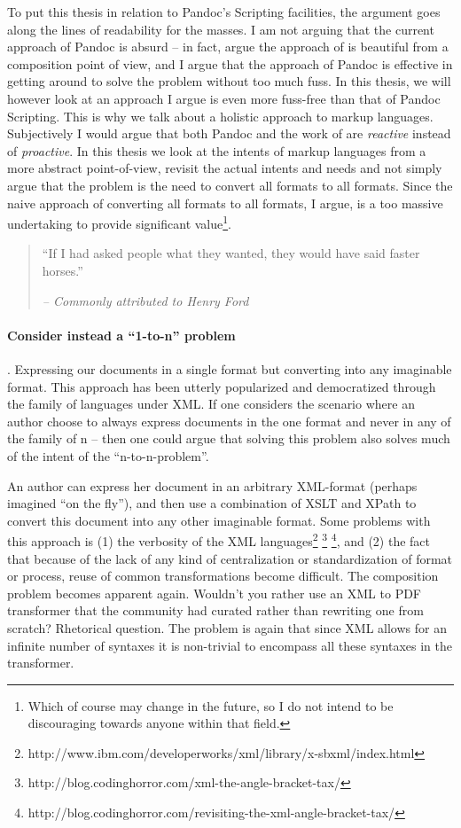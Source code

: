 \documentclass{scrreprt}
\begin{document}
To put this thesis in relation to Pandoc's Scripting facilities, the argument goes along the lines of readability for the masses. I am not arguing that the current approach of Pandoc is absurd -- in fact, argue the approach of \citet{krijnen} is beautiful from a composition point of view, and I argue that the approach of Pandoc is effective in getting around to solve the problem without too much fuss. In this thesis, we will however look at an approach I argue is even more fuss-free than that of Pandoc Scripting. This is why we talk about a holistic approach to markup languages. Subjectively I would argue that both Pandoc and the work of \citet{krijnen} are \emph{reactive} instead of \emph{proactive}. In this thesis we look at the intents of markup languages from a more abstract point-of-view, revisit the actual intents and needs and not simply argue that the problem is the need to convert all formats to all formats. Since the naive approach of converting all formats to all formats, I argue, is a too massive undertaking to provide significant value\footnote{Which of course may change in the future, so I do not intend to be discouraging towards anyone within that field.}.

\begin{quote}
``If I had asked people what they wanted, they would have said faster horses.''
\begin{flushright}
\textit{-- Commonly attributed to Henry Ford}
\end{flushright}
\end{quote}


\paragraph{Consider instead a ``1-to-n'' problem}. Expressing our documents in a single format but converting into any imaginable format. This approach has been utterly popularized and democratized through the family of languages under XML. If one considers the scenario where an author choose to always express documents in the one format and never in any of the family of n -- then one could argue that solving this problem also solves much of the intent of the ``n-to-n-problem''.

An author can express her document in an arbitrary XML-format (perhaps imagined ``on the fly''), and then use a combination of XSLT and XPath to convert this document into any other imaginable format. Some problems with this approach is (1) the verbosity of the XML languages\footnote{http://www.ibm.com/developerworks/xml/library/x-sbxml/index.html} \footnote{http://blog.codinghorror.com/xml-the-angle-bracket-tax/} \footnote{http://blog.codinghorror.com/revisiting-the-xml-angle-bracket-tax/}, and (2) the fact that because of the lack of any kind of centralization or standardization of format or process, reuse of common transformations become difficult. The composition problem becomes apparent again. Wouldn't you rather use an XML to PDF transformer that the community had curated rather than rewriting one from scratch? Rhetorical question. The problem is again that since XML allows for an infinite number of syntaxes it is non-trivial to encompass all these syntaxes in the transformer.
\end{document}
